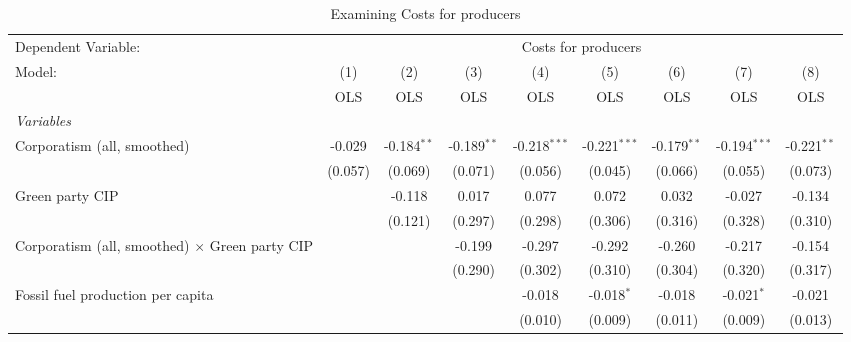 
\begin{table}[htbp]
   \caption{Examining Costs for producers}
   \centering
   \begin{tabular}{lcccccccc}
      \toprule
      Dependent Variable: & \multicolumn{8}{c}{Costs for producers}\\
      Model:                                                & (1)     & (2)           & (3)           & (4)            & (5)            & (6)           & (7)            & (8)\\  
                                                            &  OLS    & OLS           & OLS           & OLS            & OLS            & OLS           & OLS            & OLS\\  
      \midrule
      \emph{Variables}\\
      Corporatism (all, smoothed)                           & -0.029  & -0.184$^{**}$ & -0.189$^{**}$ & -0.218$^{***}$ & -0.221$^{***}$ & -0.179$^{**}$ & -0.194$^{***}$ & -0.221$^{**}$\\   
                                                            & (0.057) & (0.069)       & (0.071)       & (0.056)        & (0.045)        & (0.066)       & (0.055)        & (0.073)\\   
      Green party CIP                                       &         & -0.118        & 0.017         & 0.077          & 0.072          & 0.032         & -0.027         & -0.134\\   
                                                            &         & (0.121)       & (0.297)       & (0.298)        & (0.306)        & (0.316)       & (0.328)        & (0.310)\\   
      Corporatism (all, smoothed) $\times$ Green party CIP  &         &               & -0.199        & -0.297         & -0.292         & -0.260        & -0.217         & -0.154\\   
                                                            &         &               & (0.290)       & (0.302)        & (0.310)        & (0.304)       & (0.320)        & (0.317)\\   
      Fossil fuel production per capita                     &         &               &               & -0.018         & -0.018$^{*}$   & -0.018        & -0.021$^{*}$   & -0.021\\   
                                                            &         &               &               & (0.010)        & (0.009)        & (0.011)       & (0.009)        & (0.013)\\   

\end{tabular}
\end{table}

